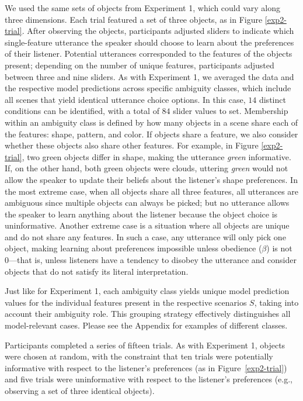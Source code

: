\documentclass[11pt,a4paper]{article}
\begin{document}
We used the same sets of objects from Experiment 1, which could vary along three dimensions. Each trial featured a set of three objects, as in Figure \ref{exp2-trial}. After observing the objects, participants adjusted sliders to indicate which single-feature utterance the speaker should choose to learn about the preferences of their listener. Potential utterances corresponded to the features of the objects present; depending on the number of unique features, participants adjusted between three and nine sliders. As with Experiment 1, we averaged the data and the respective model predictions across specific ambiguity classes, which include all scenes that yield identical utterance choice options. 
In this case, $14$ distinct conditions can be identified, with a total of $84$ slider values to set. 
Membership within an ambiguity class is defined by how many objects in a scene share each of the features: shape, pattern, and color. If objects share a feature, we also consider whether these objects also share other features. For example, in Figure \ref{exp2-trial}, two green objects differ in shape, making the utterance \textit{green} informative. If, on the other hand, both green objects were clouds, uttering \textit{green} would not allow the speaker to update their beliefs about the listener's shape preferences.
In the most extreme case, when all objects share all three features, all utterances are ambiguous since multiple objects can always be picked; but no utterance allows the speaker to learn anything about the listener because the object choice is uninformative. Another extreme case is a situation where all objects are unique and do not share any features. In such a case, any utterance will only pick one object, making learning about preferences impossible unless obedience ($\beta$) is not 0---that is, unless listeners have a tendency to disobey the utterance and consider objects that do not satisfy its literal interpretation.

Just like for Experiment 1, each ambiguity class yields unique model prediction values for the individual features present in the respective scenarios $S$, taking into account their ambiguity role. This grouping strategy effectively distinguishes all model-relevant cases. Please see the Appendix for examples of different classes.


Participants completed a series of fifteen trials. As with Experiment 1, objects were chosen at random, with the constraint that ten trials were potentially informative with respect to the listener's preferences (as in Figure~\ref{exp2-trial}) and five trials were uninformative with respect to the listener's preferences (e.g., observing a set of three identical objects).
\end{document}

